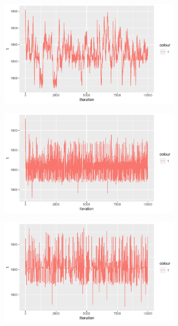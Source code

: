\begin{figure}[h]
    \centering
    \begin{subfigure}[b]{0.49\textwidth}
        \centering
        \includegraphics[width = \textwidth]{Images/sim_t_sigma_03.pdf}
        \caption{}
        \label{fig:}
    \end{subfigure}
    \begin{subfigure}[b]{0.49\textwidth}
        \centering
        \includegraphics[width = \textwidth]{Images/sim_t.pdf}
        \caption{}
        \label{fig:}
    \end{subfigure}
    \begin{subfigure}[b]{0.49\textwidth}
        \centering
        \includegraphics[width = \textwidth]{Images/sim_t_sigma_15.pdf}
        \caption{}
        \label{fig:}
    \end{subfigure}
    \caption{}
    \label{fig:}
\end{figure}


